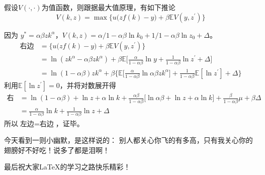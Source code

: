 \documentclass[cyan]{elegantnote}
\begin{document}
\lipsum[5-6]
\begin{newcorol}
假设$V(\cdot,\cdot)$为值函数，则跟据最大值原理，有如下推论
\[
V(k,z)=\max\Big\{u\big(zf(k)-y\big)+\beta \mathbb{E}V(y,z^\prime)\Big\}
\]
\end{newcorol}

\begin{newproof}
因为 $y^*=\alpha\beta z k^\alpha$，$V(k,z)=\alpha/1-\alpha\beta\ln k_0+1/1-\alpha\beta \ln z_0+\Delta$。
\begin{align*}
\text{右边}&=\Big\{u\big(zf(k)-y\big)+\beta \mathbb{E}V(y,z^\prime)\Big\}\\
&=\ln(zk^\alpha-\alpha\beta zk^\alpha)+\beta\mathbb{E}\Big[\frac{\alpha}{1-\alpha\beta}\ln y+\frac{1}{1-\alpha\beta}\ln z^\prime+\Delta\Big]\\
&=\ln(1-\alpha\beta)zk^\alpha+\beta\Big\{\mathbb{E}\big[\frac{\alpha}{1-\alpha\beta}\ln \alpha\beta z k^\alpha\big]+\frac{1}{1-\alpha\beta}\mathbb{E}[\ln z^\prime]+\Delta\Big\}
\end{align*}
利用$\mathbb{E}[\ln z^\prime]=0$，并将对数展开得
\begin{align*}
\text{右边}&=\ln (1-\alpha\beta)+\ln z+\alpha\ln k+\frac{\alpha\beta}{1-\alpha\beta}\big[\ln \alpha\beta+\ln z+\alpha\ln k\big]+\frac{\beta}{1-\alpha\beta}\mu+\beta \Delta\\
&=\frac{\alpha}{1-\alpha\beta}\ln k+\frac{1}{1-\alpha\beta}\ln z+\Delta
\end{align*}
所以$\text{左边}=\text{右边}$，证毕。
\end{newproof}




\begin{conclusion}
今天看到一则小幽默，是这样说的：{\color{main} 别人都关心你飞的有多高，只有我关心你的翅膀好不好吃！}说多了都是泪啊！
\end{conclusion}

最后祝大家\LaTeX{}的学习之路快乐精彩！
\end{document}
